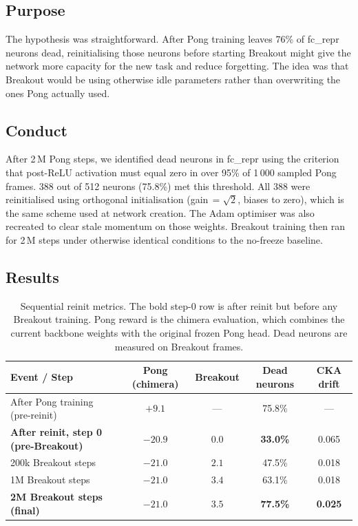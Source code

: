 \documentclass[11pt,a4paper]{article}
\begin{document}
\subsection*{Purpose}

The hypothesis was straightforward. After Pong training leaves 76\% of fc\_repr neurons
dead, reinitialising those neurons before starting Breakout might give the network more
capacity for the new task and reduce forgetting. The idea was that Breakout would be using
otherwise idle parameters rather than overwriting the ones Pong actually used.

\subsection*{Conduct}

After 2\,M Pong steps, we identified dead neurons in fc\_repr using the criterion that
post-ReLU activation must equal zero in over 95\% of 1\,000 sampled Pong frames. 388
out of 512 neurons (75.8\%) met this threshold. All 388 were reinitialised using
orthogonal initialisation (gain\,$=\!\sqrt{2}$, biases to zero), which is the same
scheme used at network creation. The Adam optimiser was also recreated to clear stale
momentum on those weights. Breakout training then ran for 2\,M steps under otherwise
identical conditions to the no-freeze baseline.

\subsection*{Results}

\begin{table}[h]
\centering\small
\begin{tabular}{lcccc}
\toprule
\textbf{Event / Step} & \textbf{Pong (chimera)} & \textbf{Breakout} & \textbf{Dead neurons} & \textbf{CKA drift} \\
\midrule
After Pong training (pre-reinit)             & $+9.1$  & ---   & 75.8\%  & --- \\
\textbf{After reinit, step 0 (pre-Breakout)} & $\mathbf{-20.9}$ & $0.0$ & \textbf{33.0\%} & 0.065 \\
200k Breakout steps                          & $-21.0$ & $2.1$ & 47.5\%  & 0.018 \\
1M Breakout steps                            & $-21.0$ & $3.4$ & 63.1\%  & 0.018 \\
\textbf{2M Breakout steps (final)}           & $\mathbf{-21.0}$ & $\mathbf{3.5}$ & \textbf{77.5\%} & \textbf{0.025} \\
\bottomrule
\end{tabular}
\caption{Sequential reinit metrics. The bold step-0 row is after reinit but before any
Breakout training. Pong reward is the chimera evaluation, which combines the current
backbone weights with the original frozen Pong head. Dead neurons are measured on
Breakout frames.}
\end{table}
\end{document}

